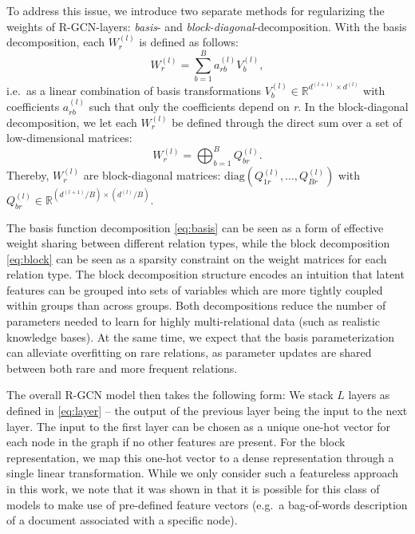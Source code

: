 To address this issue, we introduce two separate methods for regularizing the weights of R-GCN-layers: \textit{basis}- and \textit{block-diagonal}-decomposition. With the basis decomposition, each $W_r^{(l)}$ is defined as follows:
\begin{equation}
\label{eq:basis}
W_r^{(l)} = \sum_{b=1}^B a_{rb}^{(l)} V_b^{(l)},
\end{equation}
i.e.~as a linear combination of basis transformations $V_b^{(l)}\in\mathbb{R}^{d^{(l+1)}\times d^{(l)}}$ with coefficients $a_{rb}^{(l)}$ such that only the coefficients depend on \textit{r}. In the block-diagonal decomposition, we let each $W_r^{(l)}$ be defined through the direct sum over a set of low-dimensional matrices:
\begin{equation}
\label{eq:block}
W_r^{(l)} = \bigoplus_{b=1}^B Q^{(l)}_{br}.
\end{equation}
Thereby, $W_r^{(l)}$ are block-diagonal matrices:
$\mathrm{diag}(Q^{(l)}_{1r}, \ldots, Q^{(l)}_{Br})$ with $Q^{(l)}_{br} \in \mathbb{R}^{(d^{(l+1)}/B)\times( d^{(l)}/B)}$.

The basis function decomposition \eqref{eq:basis} can be seen as a form of effective weight sharing between different relation types, while the block decomposition \eqref{eq:block} can be seen as a sparsity constraint on the weight matrices for each relation type. The block decomposition structure encodes an intuition that latent features can be grouped into sets of variables which are more tightly coupled within groups than across groups.
Both decompositions reduce the number of parameters needed to learn for highly multi-relational data (such as realistic knowledge bases). At the same time, we expect that the basis parameterization can alleviate overfitting on rare relations, as parameter updates are shared between both rare and more frequent relations.

The overall R-GCN model then takes the following form: We stack $L$ layers as defined in \eqref{eq:layer} -- the output of the previous layer being the input to the next layer. The input to the first layer can be chosen as a unique one-hot vector for each node in the graph if no other features are present. For the block representation, we map this one-hot vector to a dense representation through a single linear transformation. While we only consider such a featureless approach in this work, we note that it was shown in \citet{kipf2016semi} that it is possible for this class of models to make use of pre-defined feature vectors (e.g.~a bag-of-words description of a document associated with a specific node).

